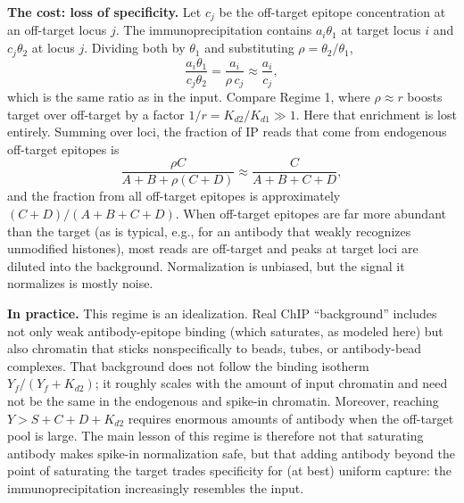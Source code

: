 \textbf{The cost: loss of specificity.} Let $c_j$ be the off-target
epitope concentration at an off-target locus $j$. The immunoprecipitation
contains $a_i\theta_1$ at target locus $i$ and $c_j\theta_2$ at locus
$j$. Dividing both by $\theta_1$ and substituting $\rho=\theta_2/\theta_1$,
$$
\frac{a_i\theta_1}{c_j\theta_2}
=\frac{a_i}{\rho\,c_j}
\approx\frac{a_i}{c_j},
$$
which is the same ratio as in the input. Compare Regime 1, where
$\rho\approx r$ boosts target over off-target by a factor $1/r=K_{d2}/K_{d1}\gg1$.
Here that enrichment is lost entirely. Summing over loci, the fraction
of IP reads that come from endogenous off-target epitopes is
$$
\frac{\rho C}{A+B+\rho(C+D)}\approx\frac{C}{A+B+C+D},
$$
and the fraction from all off-target epitopes is approximately
$(C+D)/(A+B+C+D)$. When off-target epitopes are far more abundant than
the target (as is typical, e.g., for an antibody that weakly recognizes
unmodified histones), most reads are off-target and peaks at target loci
are diluted into the background. Normalization is unbiased, but the
signal it normalizes is mostly noise.

\textbf{In practice.} This regime is an idealization. Real ChIP
``background'' includes not only weak antibody-epitope binding (which
saturates, as modeled here) but also chromatin that sticks
nonspecifically to beads, tubes, or antibody-bead complexes. That
background does not follow the binding isotherm $Y_f/(Y_f+K_{d2})$; it
roughly scales with the amount of input chromatin and need not be the
same in the endogenous and spike-in chromatin. Moreover, reaching
$Y>S+C+D+K_{d2}$ requires enormous amounts of antibody when the
off-target pool is large. The main lesson of this regime is therefore
not that saturating antibody makes spike-in normalization safe, but that
adding antibody beyond the point of saturating the target trades
specificity for (at best) uniform capture: the immunoprecipitation
increasingly resembles the input.
